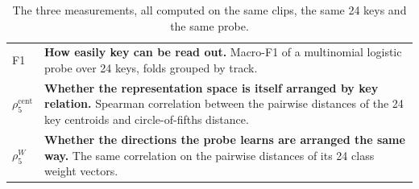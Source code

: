 \begin{table}[t]
\centering
\footnotesize
\setlength{\tabcolsep}{4pt}
\caption{The three measurements, all computed on the same clips, the same 24 keys and the same probe.}
\label{tab:measures}
\begin{tabular}{@{}l p{}@{}}
\toprule
F1 & \textbf{How easily key can be read out.} Macro-F1 of a multinomial
logistic probe over 24 keys, folds grouped by track. \\
\addlinespace[2pt]
$\rho^{\text{cent}}_{5}$ & \textbf{Whether the representation space is itself
arranged by key relation.} Spearman correlation between the pairwise distances
of the 24 key centroids and circle-of-fifths distance. \\
\addlinespace[2pt]
$\rho^{W}_{5}$ & \textbf{Whether the directions the probe learns are arranged
the same way.} The same correlation on the pairwise distances of its 24 class
weight vectors. \\
\bottomrule
\end{tabular}
\end{table}
